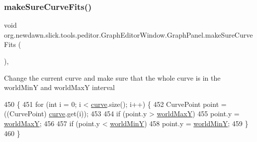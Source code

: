 \subsubsection{\texorpdfstring{make\+Sure\+Curve\+Fits()}{makeSureCurveFits()}}
{\footnotesize\ttfamily void org.\+newdawn.\+slick.\+tools.\+peditor.\+Graph\+Editor\+Window.\+Graph\+Panel.\+make\+Sure\+Curve\+Fits (\begin{DoxyParamCaption}{ }\end{DoxyParamCaption})\hspace{0.3cm}{\ttfamily [inline]}, {\ttfamily [private]}}

Change the current curve and make sure that the whole curve is in the world\+MinY and world\+MaxY interval 
\begin{DoxyCode}
450                                          \{
451             \textcolor{keywordflow}{for} (\textcolor{keywordtype}{int} i = 0; i < \mbox{\hyperlink{classorg_1_1newdawn_1_1slick_1_1tools_1_1peditor_1_1_graph_editor_window_1_1_graph_panel_ac95a7a77b5e8460041f157c02e19d2bb}{curve}}.size(); i++) \{
452                 CurvePoint point = ((CurvePoint) \mbox{\hyperlink{classorg_1_1newdawn_1_1slick_1_1tools_1_1peditor_1_1_graph_editor_window_1_1_graph_panel_ac95a7a77b5e8460041f157c02e19d2bb}{curve}}.get(i));
453 
454                 \textcolor{keywordflow}{if} (point.y > \mbox{\hyperlink{classorg_1_1newdawn_1_1slick_1_1tools_1_1peditor_1_1_graph_editor_window_1_1_graph_panel_a9b7733b23535ca22b1cbdb029587dcfe}{worldMaxY}})
455                     point.y = \mbox{\hyperlink{classorg_1_1newdawn_1_1slick_1_1tools_1_1peditor_1_1_graph_editor_window_1_1_graph_panel_a9b7733b23535ca22b1cbdb029587dcfe}{worldMaxY}};
456 
457                 \textcolor{keywordflow}{if} (point.y < \mbox{\hyperlink{classorg_1_1newdawn_1_1slick_1_1tools_1_1peditor_1_1_graph_editor_window_1_1_graph_panel_ad95df88110fd1b220a1fbe80850f84b4}{worldMinY}})
458                     point.y = \mbox{\hyperlink{classorg_1_1newdawn_1_1slick_1_1tools_1_1peditor_1_1_graph_editor_window_1_1_graph_panel_ad95df88110fd1b220a1fbe80850f84b4}{worldMinY}};
459             \}
460         \}
\end{DoxyCode}
\mbox{\label{classorg_1_1newdawn_1_1slick_1_1tools_1_1peditor_1_1_graph_editor_window_1_1_graph_panel_a919b8141a6fcc02c730ef42efc395e8b}} 
